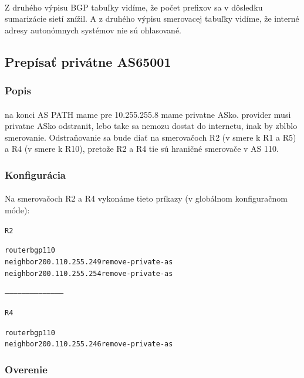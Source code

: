 \documentclass[12pt,twoside,a4paper]{report}
\begin{document}
\paragraph{}
Z druhého výpisu BGP tabuľky vidíme, že počet prefixov sa v dôsledku sumarizácie sietí znížil. A z druhého výpisu smerovacej tabuľky vidíme, že interné adresy autonómnych systémov nie sú ohlasované.





\subsection{Prepísať privátne AS65001}
\subsubsection{Popis}
\paragraph{}
na konci AS PATH mame pre 10.255.255.8 mame privatne ASko. provider musi privatne ASko odstranit, lebo take sa nemozu dostat do internetu, inak by zblblo smerovanie. Odstraňovanie sa bude diať na smerovačoch R2 (v smere k R1 a R5) a R4 (v smere k R10), pretože R2 a R4 tie sú hraničné smerovače v AS 110.

\subsubsection{Konfigurácia}
\paragraph{}
Na smerovačoch R2 a R4 vykonáme tieto príkazy (v globálnom konfiguračnom móde):

\noindent
{\selectfont
\begin{small}
\begin{alltt}
R2

router bgp 110
neighbor 200.110.255.249 remove-private-as
neighbor 200.110.255.254 remove-private-as

------------------------------------------

R4

router bgp 110
neighbor 200.110.255.246 remove-private-as
\end{alltt}
\end{small}
}


\subsubsection{Overenie}
\end{document}
